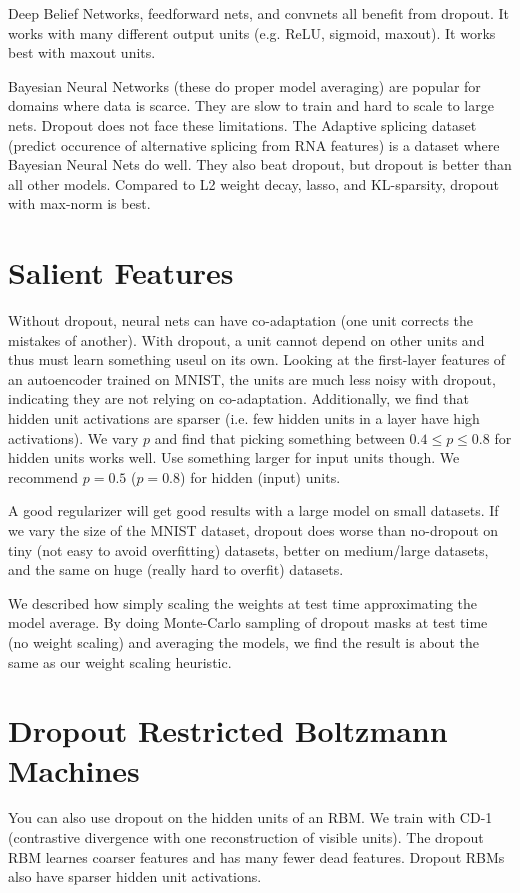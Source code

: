 \documentclass[a4paper]{article}
\begin{document}
Deep Belief Networks, feedforward nets, and convnets all benefit from dropout.
It works with many different output units (e.g. ReLU, sigmoid, maxout). It works
best with maxout units.

Bayesian Neural Networks (these do proper model averaging) are popular for
domains where data is scarce. They are slow to train and hard to scale to large
nets. Dropout does not face these limitations. The Adaptive splicing dataset
(predict occurence of alternative splicing from RNA features) is a dataset
where Bayesian Neural Nets do well. They also beat dropout, but dropout is
better than all other models. Compared to L2 weight decay, lasso, and
KL-sparsity, dropout with max-norm is best.

\section{Salient Features}
Without dropout, neural nets can have co-adaptation (one unit corrects the
mistakes of another). With dropout, a unit cannot depend on other units and
thus must learn something useul on its own. Looking at the first-layer
features of an autoencoder trained on MNIST, the units are much less noisy
with dropout, indicating they are not relying on co-adaptation. Additionally,
we find that hidden unit activations are sparser (i.e. few hidden units in a
layer have high activations). We vary $p$ and find that picking something
between $0.4 \leq p \leq 0.8$ for hidden units works well. Use something
larger for input units though. We recommend $p = 0.5$ ($p = 0.8$) for hidden
(input) units.

A good regularizer will get good results with a large model on small datasets.
If we vary the size of the MNIST dataset, dropout does worse than no-dropout
on tiny (not easy to avoid overfitting) datasets, better on medium/large
datasets, and the same on huge (really hard to overfit) datasets.

We described how simply scaling the weights at test time approximating the
model average. By doing Monte-Carlo sampling of dropout masks at test time
(no weight scaling) and averaging the models, we find the result is about
the same as our weight scaling heuristic.

\section{Dropout Restricted Boltzmann Machines}
You can also use dropout on the hidden units of an RBM. We train with CD-1
(contrastive divergence with one reconstruction of visible units). The dropout
RBM learnes coarser features and has many fewer dead features. Dropout
RBMs also have sparser hidden unit activations.
\end{document}
